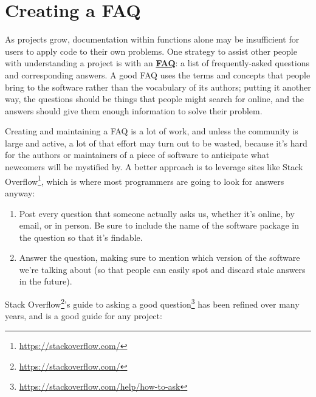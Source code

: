 \documentclass[
]{krantz}
\renewcommand{\href}[2]{#2\footnote{\url{#1}}}
\newcommand{\gref}[2]{\hyperlink{#2}{\textbf{#1}}}
\begin{document}
\hypertarget{documentation-faq}{%
\section{Creating a FAQ}\label{documentation-faq}}

As projects grow,
documentation within functions alone may be insufficient for users to apply code to their own problems.
One strategy to assist other people with understanding a project is with
an \gref{FAQ}{faq}:
a list of frequently-asked questions and corresponding answers.
A good FAQ uses the terms and concepts that people bring to the software
rather than the vocabulary of its authors;
putting it another way,
the questions should be things that people might search for online,
and the answers should give them enough information to solve their problem.

Creating and maintaining a FAQ is a lot of work,
and unless the community is large and active,
a lot of that effort may turn out to be wasted,
because it's hard for the authors or maintainers of a piece of software
to anticipate what newcomers will be mystified by.
A better approach is to leverage sites like \href{https://stackoverflow.com/}{Stack Overflow},
which is where most programmers are going to look for answers anyway:

\begin{enumerate}
\def\labelenumi{\arabic{enumi}.}
\item
  Post every question that someone actually asks us,
  whether it's online, by email, or in person.
  Be sure to include the name of the software package in the question
  so that it's findable.
\item
  Answer the question,
  making sure to mention which version of the software we're talking about
  (so that people can easily spot and discard stale answers in the future).
\end{enumerate}

\href{https://stackoverflow.com/}{Stack Overflow}'s guide to \href{https://stackoverflow.com/help/how-to-ask}{asking a good question}
has been refined over many years,
and is a good guide for any project:
\end{document}
